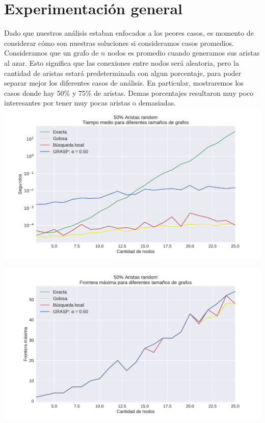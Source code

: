 \section{Experimentación general}

Dado que nuestros análisis estaban enfocados a los peores casos, es momento de considerar cómo son nuestras soluciones si consideramos casos promedios.  \\

Consideramos que un grafo de $n$ nodos es promedio cuando generamos sus aristas al azar. Esto significa que las conexiones entre nodos será aleatoria, pero la cantidad de aristas estará predeterminada con algun porcentaje, para poder separar mejor los diferentes casos de análisis. En particular, mostraremos los casos donde hay 50\% y 75\% de aristas. Demas porcentajes resultaron muy poco interesantes por tener muy pocas aristas o demasiadas. \\

{\centering
    \includegraphics[width=1\textwidth]{informe/imgs/exp_random50_tiempo_todos_v2.pdf}
}

{\centering
    \includegraphics[width=1\textwidth]{informe/imgs/exp_random50_frontera_todos_v2.pdf}
}


